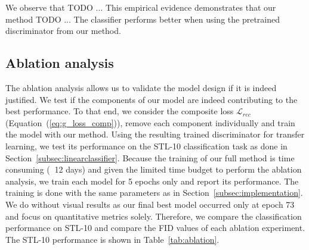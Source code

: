 \documentclass[12pt,a4paper]{article}
\begin{document}
We observe that TODO ... This empirical evidence demonstrates that our method TODO ...
The classifier performs better when using the pretrained discriminator from our method. 

\subsection{Ablation analysis}
The ablation analysis allows us to validate the model design if it is indeed justified. We test if the components of our model are indeed contributing to the best performance. To that end, we consider the composite loss $\mathcal{L}_{rec}$ (Equation~(\ref{eq:g_loss_comp})), remove each component individually and train the model with our method. Using the resulting trained discriminator for transfer learning, we test its performance on the STL-10 classification task as done in Section~\ref{subsec:linearclassifier}. Because the training of our full method is time consuming ($~$ 12 days) and given the limited time budget to perform the ablation analysis, we train each model for 5 epochs only and report its performance. The training is done with the same parameters as in Section~\ref{subsec:implementation}. We do without visual results as our final best model occurred only at epoch 73 and focus on quantitative metrics solely. Therefore, we compare the classification performance on STL-10 and compare the FID values of each ablation experiment. The STL-10 performance is shown in Table~\ref{tab:ablation}.

% 
% 	
% 
\end{document}
